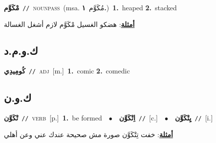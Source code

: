 \documentclass[10pt,a4paper,twoside]{article} %
\begin{document}
\begin{multicols}{2}
{\setlength\topsep{0pt}\textbf{\foreignlanguage{arabic}{مْكَوَّم}}\ {\color{gray}\texttt{//}\color{black}}\ \textsc{noun\textunderscore pass}\ \color{gray}(msa. \foreignlanguage{arabic}{مُكَوَّم}~\foreignlanguage{arabic}{\textbf{١.}})\color{black}\ \textbf{1.}~heaped  \textbf{2.}~stacked\  \begin{flushright}\color{gray}\foreignlanguage{arabic}{\textbf{\underline{\foreignlanguage{arabic}{أمثلة}}}: هضكو الغسيل مْكَوَّم لازم أشغل الغسالة}\end{flushright}\color{black}} \vspace{2mm}

\vspace{-3mm}
\subsection*{\color{blue}\foreignlanguage{arabic}{ك.و.م.د}\color{blue}{}} 

{\setlength\topsep{0pt}\textbf{\foreignlanguage{arabic}{كُومِيدِي}}\ {\color{gray}\texttt{//}\color{black}}\ \textsc{adj}\ [m.]\ \textbf{1.}~comic  \textbf{2.}~comedic\ } \vspace{2mm}

\vspace{-3mm}
\subsection*{\color{blue}\foreignlanguage{arabic}{ك.و.ن}\color{blue}{}} 

{\setlength\topsep{0pt}\textbf{\foreignlanguage{arabic}{تْكَوَّن}}\ {\color{gray}\texttt{//}\color{black}}\ \textsc{verb}\ [p.]\ \textbf{1.}~be formed\ \ $\bullet$\ \ \setlength\topsep{0pt}\textbf{\foreignlanguage{arabic}{اِتْكَوَّن}}\ {\color{gray}\texttt{//}\color{black}}\ [c.]\ \ $\bullet$\ \ \setlength\topsep{0pt}\textbf{\foreignlanguage{arabic}{يِتْكَوَّن}}\ {\color{gray}\texttt{//}\color{black}}\ [i.]\  \begin{flushright}\color{gray}\foreignlanguage{arabic}{\textbf{\underline{\foreignlanguage{arabic}{أمثلة}}}: خفت تِتْكَوَّن صورة مش صحيحة عندك عني وعن أهلي}\end{flushright}\color{black}} \vspace{2mm}


\end{multicols}
\end{document}
